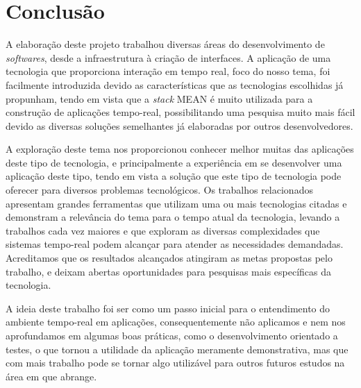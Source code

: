 \chapter{Conclusão}
A elaboração deste projeto trabalhou diversas áreas do desenvolvimento de \textit{softwares}, desde a infraestrutura à criação de interfaces. A aplicação de uma tecnologia que proporciona interação em tempo real, foco do nosso tema, foi facilmente introduzida devido as características que as tecnologias escolhidas já propunham, tendo em vista que a \textit{stack} MEAN é muito utilizada para a construção de aplicações tempo-real, possibilitando uma pesquisa muito mais fácil devido as diversas soluções semelhantes já elaboradas por outros desenvolvedores.

A exploração deste tema nos proporcionou conhecer melhor muitas das aplicações deste tipo de tecnologia, e principalmente a experiência em se desenvolver uma aplicação deste tipo, tendo em vista a solução que este tipo de tecnologia pode oferecer para diversos problemas tecnológicos. Os trabalhos relacionados apresentam grandes ferramentas que utilizam uma ou mais tecnologias citadas e demonstram a relevância do tema para o tempo atual da tecnologia, levando a trabalhos cada vez maiores e que exploram as diversas complexidades que sistemas tempo-real podem alcançar para atender as necessidades demandadas. Acreditamos que os resultados alcançados atingiram as metas propostas pelo trabalho, e deixam abertas oportunidades para pesquisas mais específicas da tecnologia.

A ideia deste trabalho foi ser como um passo inicial para o entendimento do ambiente tempo-real em aplicações, consequentemente não aplicamos e nem nos aprofundamos em algumas boas práticas, como o desenvolvimento orientado a testes, o que tornou a utilidade da aplicação meramente demonstrativa, mas que com mais trabalho pode se tornar algo utilizável para outros futuros estudos na área em que abrange.



